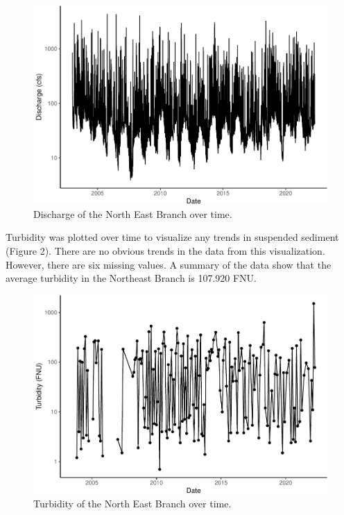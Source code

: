 \documentclass[
  12pt,
]{article}
\begin{document}
\begin{figure}

\includegraphics{Project_Template_files/figure-latex/Discharge over time-1} \hfill{}

\caption{Discharge of the North East Branch over time.}\label{fig:Discharge over time}
\end{figure}

\newpage

Turbidity was plotted over time to visualize any trends in suspended
sediment (Figure 2). There are no obvious trends in the data from this
visualization. However, there are six missing values. A summary of the
data show that the average turbidity in the Northeast Branch is 107.920
FNU.

\begin{figure}

\includegraphics{Project_Template_files/figure-latex/Turbidity over time-1} \hfill{}

\caption{Turbidity of the North East Branch over time.}\label{fig:Turbidity over time}
\end{figure}
\end{document}
